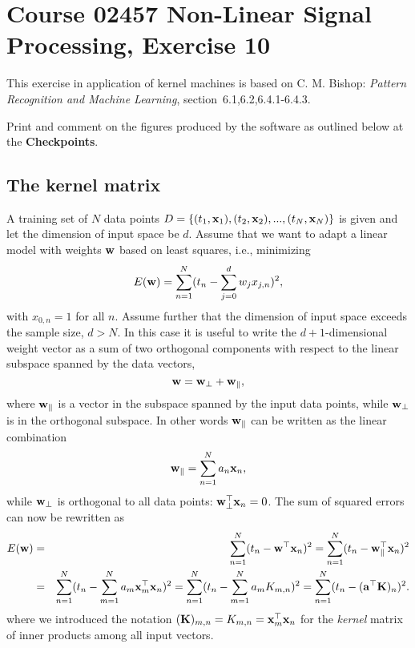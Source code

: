 \documentclass[12pt]{article}    %
\def\xb{{\bf x}}
\def\wb{{\bf w}}
\def\Kb{{\bf K}}
\def\ab{{\bf a}}
\begin{document}
\section*{Course 02457 Non-Linear Signal Processing, Exercise 10}

This exercise in application of kernel machines is based on C. M. Bishop: {\em Pattern Recognition
and Machine Learning}, section~6.1,6.2,6.4.1-6.4.3.

Print and comment on the figures produced by the software as outlined below at the {\bf
Checkpoints}.

\subsection*{The kernel matrix}
A training set of $N$ data points $D=\{(t_1,\xb_1),(t_2,\xb_2),...,(t_N,\xb_N)\}$ is
given and let the dimension of input space be $d$. Assume that we want to adapt a linear model with weights $\wb$ based on least squares, i.e., minimizing
\begin{equation}
E(\wb) = \sum_{n =1}^{N}( t_n - \sum_{j=0}^{d} w_j x_{j,n} )^2,  \label{lse}
\end{equation}
with $x_{0,n}=1$ for all $n$. Assume further that the dimension of input space exceeds the sample size, $d > N$. In this case it is useful to write the $d+1$-dimensional weight vector as a sum of two orthogonal components with respect to the linear subspace spanned by the data vectors,
\begin{equation}
\wb = \wb_{\small \perp} + \wb_{\small \parallel},
\end{equation}
where $\wb_{\small \parallel}$ is a vector in the subspace spanned by the input data points, while $\wb_{\small \perp}$ is in the orthogonal subspace. In other words
$\wb_{\small \parallel}$ can be written as the linear combination
\begin{equation}
 \wb_{\small \parallel} = \sum_{n=1}^N a_n \xb_n,
\end{equation}
while $\wb_{\small \perp}$ is orthogonal to all data points: $\wb_{\small \perp}^{\top}\xb_n =0$.   The sum of squared errors can now be rewritten as
\begin{eqnarray}
E(\wb) &=& \sum_{n =1}^{N}( t_n - \wb^{\top}\xb_n )^2 = \sum_{n =1}^{N}( t_n - \wb_{\small \parallel}^{\top}\xb_n )^2 \\ \nonumber
 &=& \sum_{n =1}^{N}( t_n - \sum_{m=1}^N a_m \xb_m^{\top}\xb_n )^2 = \sum_{n =1}^{N} ( t_n - \sum_{m=1}^N a_m K_{m,n})^2 =\sum_{n =1}^{N}( t_n - (\ab^{\top} \Kb)_n )^2.
\end{eqnarray}
where we introduced the notation $(\Kb)_{m,n} = K_{m,n}=\xb_m^{\top}\xb_n$ for the \emph{kernel} matrix of inner products among all input vectors.
\end{document}

